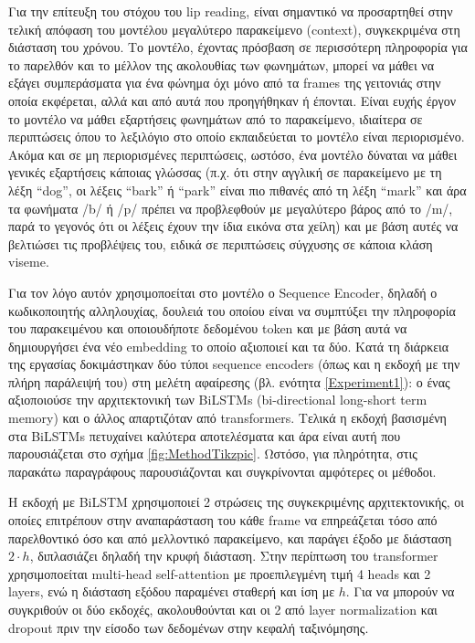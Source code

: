 Για την επίτευξη του στόχου του lip reading, είναι σημαντικό να προσαρτηθεί στην τελική απόφαση του μοντέλου μεγαλύτερο παρακείμενο (context), συγκεκριμένα στη διάσταση του χρόνου. Το μοντέλο, έχοντας πρόσβαση σε περισσότερη πληροφορία για το παρελθόν και το μέλλον της ακολουθίας των φωνημάτων, μπορεί να μάθει να εξάγει συμπεράσματα για ένα φώνημα όχι μόνο από τα frames της γειτονιάς στην οποία εκφέρεται, αλλά και από αυτά που προηγήθηκαν ή έπονται. Είναι ευχής έργον το μοντέλο να μάθει εξαρτήσεις φωνημάτων από το παρακείμενο, ιδιαίτερα σε περιπτώσεις όπου το λεξιλόγιο στο οποίο εκπαιδεύεται το μοντέλο είναι περιορισμένο. Ακόμα και σε μη περιορισμένες περιπτώσεις, ωστόσο, ένα μοντέλο δύναται να μάθει γενικές εξαρτήσεις κάποιας γλώσσας (π.χ. ότι στην αγγλική σε παρακείμενο με τη λέξη ``dog'', οι λέξεις ``bark'' ή ``park'' είναι πιο πιθανές από τη λέξη ``mark'' και άρα τα φωνήματα /b/ ή /p/ πρέπει να προβλεφθούν με μεγαλύτερο βάρος από το /m/, παρά το γεγονός ότι οι λέξεις έχουν την ίδια εικόνα στα χείλη) και με βάση αυτές να βελτιώσει τις προβλέψεις του, ειδικά σε περιπτώσεις σύγχυσης σε κάποια κλάση viseme. 

Για τον λόγο αυτόν χρησιμοποείται στο μοντέλο ο Sequence Encoder, δηλαδή ο κωδικοποιητής αλληλουχίας, δουλειά του οποίου είναι να συμπτύξει την πληροφορία του παρακειμένου και οποιουδήποτε δεδομένου token και με βάση αυτά να δημιουργήσει ένα νέο embedding το οποίο αξιοποιεί και τα δύο. Κατά τη διάρκεια της εργασίας δοκιμάστηκαν δύο τύποι sequence encoders (όπως και η εκδοχή με την πλήρη παράλειψή του) στη μελέτη αφαίρεσης (βλ. ενότητα \ref{Experiment1}): ο ένας αξιοποιούσε την αρχιτεκτονική των BiLSTMs (bi-directional long-short term memory) και ο άλλος απαρτιζόταν από transformers. Τελικά η εκδοχή βασισμένη στα BiLSTMs πετυχαίνει καλύτερα αποτελέσματα και άρα είναι αυτή που παρουσιάζεται στο σχήμα \ref{fig:MethodTikzpic}. Ωστόσο, για πληρότητα, στις παρακάτω παραγράφους παρουσιάζονται και συγκρίνονται αμφότερες οι μέθοδοι.

Η εκδοχή με BiLSTM χρησιμοποιεί 2 στρώσεις της συγκεκριμένης αρχιτεκτονικής, οι οποίες επιτρέπουν στην αναπαράσταση του κάθε frame να επηρεάζεται τόσο από παρελθοντικό όσο και από μελλοντικό παρακείμενο, και παράγει έξοδο με διάσταση $2\cdot h$, διπλασιάζει δηλαδή την κρυφή διάσταση. Στην περίπτωση του transformer χρησιμοποείται multi-head self-attention με προεπιλεγμένη τιμή 4 heads και 2 layers, ενώ η διάσταση εξόδου παραμένει σταθερή και ίση με $h$. Για να μπορούν να συγκριθούν οι δύο εκδοχές, ακολουθούνται και οι 2 από layer normalization και dropout πριν την είσοδο των δεδομένων στην κεφαλή ταξινόμησης.

